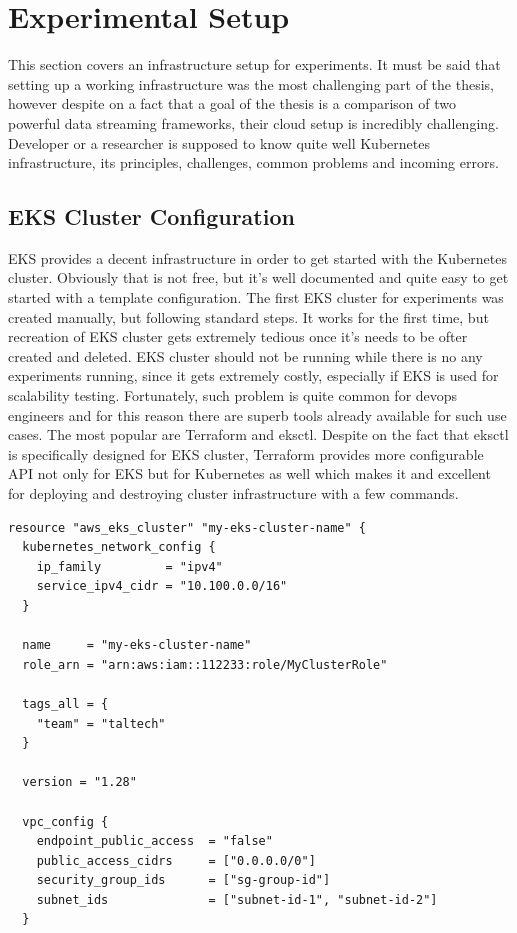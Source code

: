 %
%
%


\section{Experimental Setup}\label{sec:exp-setup}
This section covers an infrastructure setup for experiments.
It must be said that setting up a working infrastructure was the most
challenging part of the thesis, however despite on a fact that a goal
of the thesis is a comparison of two powerful data streaming frameworks,
their cloud setup is incredibly challenging.
Developer or a researcher is supposed to know quite well Kubernetes infrastructure,
its principles, challenges, common problems and incoming errors.


\subsection{EKS Cluster Configuration}\label{subsec:eks-cluster-configuration}
EKS provides a decent infrastructure in order to get started with the
Kubernetes cluster.
Obviously that is not free, but it's well documented and quite easy
to get started with a template configuration.
The first EKS cluster for experiments was created manually, but following
standard steps.
It works for the first time, but recreation of EKS cluster gets extremely
tedious once it's needs to be ofter created and deleted.
EKS cluster should not be running while there is no any experiments running, since
it gets extremely costly, especially if EKS is used for scalability testing.
Fortunately, such problem is quite common for devops engineers and for this
reason there are superb tools already available for such use cases.
The most popular are Terraform and eksctl.
Despite on the fact that eksctl is specifically designed for EKS cluster, Terraform
provides more configurable API not only for EKS but for Kubernetes as well which
makes it and excellent for deploying and destroying cluster infrastructure
with a few commands.

\begin{lstlisting}[label={lst:eks-example}]
resource "aws_eks_cluster" "my-eks-cluster-name" {
  kubernetes_network_config {
    ip_family         = "ipv4"
    service_ipv4_cidr = "10.100.0.0/16"
  }

  name     = "my-eks-cluster-name"
  role_arn = "arn:aws:iam::112233:role/MyClusterRole"

  tags_all = {
    "team" = "taltech"
  }

  version = "1.28"

  vpc_config {
    endpoint_public_access  = "false"
    public_access_cidrs     = ["0.0.0.0/0"]
    security_group_ids      = ["sg-group-id"]
    subnet_ids              = ["subnet-id-1", "subnet-id-2"]
  }
\end{lstlisting}


